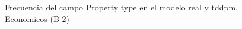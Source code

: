 \begin{figure}[H]
    \centering
    
    \caption{Frecuencia del campo Property type en el modelo real y tddpm, Economicos (B-2)}
    \label{frecuency-Property Type-tddpm_mlp}
\end{figure}